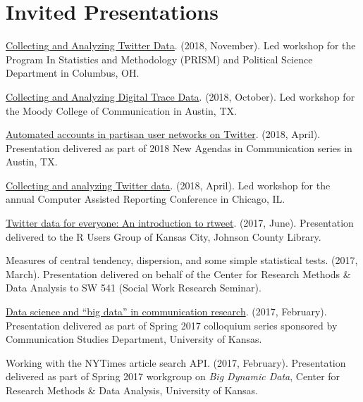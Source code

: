 \section{Invited Presentations}
  \begin{bibenum}
    \item[] \href{https://rtweet-workshop.mikewk.com}{Collecting and Analyzing Twitter Data}. (2018, November).
      Led workshop for the Program In Statistics and Methodology (PRISM) and Political Science Department in Columbus, OH.
    \item[] \href{https://mkearney.github.io/moody_rstats}{Collecting and Analyzing Digital Trace Data}. (2018, October).
      Led workshop for the Moody College of Communication in Austin, TX.
    \item[] \href{https://mkearney.github.io/utchapter/presentation}{Automated accounts in partisan user networks on Twitter}. (2018, April).
      Presentation delivered as part of 2018 New Agendas in Communication series in Austin, TX.
    \item[] \href{https://mkearney.github.io/nicar_tworkshop}{Collecting and analyzing Twitter data}. (2018, April).
      Led workshop for the annual Computer Assisted Reporting Conference in Chicago, IL.
    \item[] \href{https://mkearney.github.io/rusersKC}{Twitter data for everyone: An introduction to rtweet}. (2017, June).
      Presentation delivered to the R Users Group of Kansas City, Johnson County Library.
    \item[] Measures of central tendency, dispersion, and some simple statistical tests. (2017, March).
      Presentation delivered on behalf of the Center for Research Methods \& Data Analysis to SW 541 (Social Work Research Seminar).
    \item[] \href{https://mkearney.github.io/COLLOQUIUM/slides.html}{Data science and ``big data'' in communication research}. (2017, February).
      Presentation delivered as part of Spring 2017 colloquium series sponsored by Communication Studies Department, University of Kansas.
    \item[] Working with the NYTimes article search API. (2017, February).
      Presentation delivered as part of Spring 2017 workgroup on \textit{Big Dynamic Data},
      Center for Research Methods \& Data Analysis, University of Kansas.

\end{bibenum}
